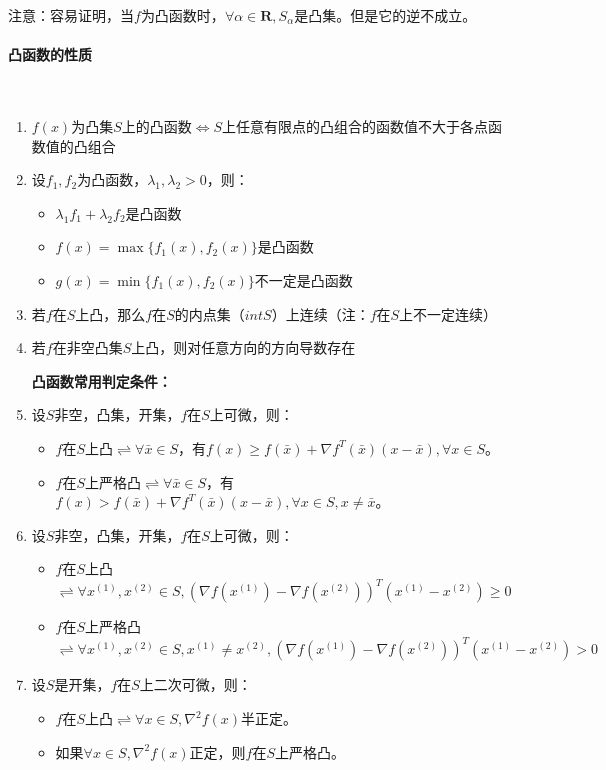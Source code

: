 \documentclass{book}
\newcommand{\subsubsubsection}[1]{\paragraph{#1}\mbox{}\\}
\begin{document}
注意：容易证明，当$f$为凸函数时，$\forall\alpha\in\mathbf{R}, S_{\alpha}$是凸集。但是它的逆不成立。

\subsubsubsection{凸函数的性质}

\begin{enumerate}
    \item $f(x)$为凸集$S$上的凸函数$\Leftrightarrow S$上任意有限点的凸组合的函数值不大于各点函数值的凸组合
    \item 设$f_1,f_2$为凸函数，$\lambda_1,\lambda_2>0$，则：
          \begin{itemize}
              \item $\lambda_1f_1+\lambda_2f_2$是凸函数
              \item $f(x)=\max\{f_1(x),f_2(x)\}$是凸函数
              \item $g(x)=\min\{f_1(x),f_2(x)\}$不一定是凸函数
          \end{itemize}
    \item 若$f$在$S$上凸，那么$f$在$S$的内点集（$intS$）上连续（注：$f$在$S$上不一定连续）
    \item 若$f$在非空凸集$S$上凸，则对任意方向的方向导数存在

          \textbf{凸函数常用判定条件：}
    \item 设$S$非空，凸集，开集，$f$在$S$上可微，则：
          \begin{itemize}
              \item $f$在$S$上凸$\rightleftharpoons \forall \bar{x}\in S$，有$f(x)\ge f(\bar{x})+\nabla f^T(\bar{x})(x-\bar{x}), \forall x\in S$。
              \item $f$在$S$上严格凸$\rightleftharpoons \forall \bar{x}\in S$，有$f(x)> f(\bar{x})+\nabla f^T(\bar{x})(x-\bar{x}), \forall x\in S,x\ne\bar{x}$。
          \end{itemize}
    \item 设$S$非空，凸集，开集，$f$在$S$上可微，则：
          \begin{itemize}
              \item $f$在$S$上凸$\rightleftharpoons \forall x^{(1)},x^{(2)}\in S,(\nabla f(x^{(1)})-\nabla f(x^{(2)}))^T(x^{(1)}-x^{(2)})\ge 0$
              \item $f$在$S$上严格凸$\rightleftharpoons \forall x^{(1)},x^{(2)}\in S, x^{(1)}\ne x^{(2)},(\nabla f(x^{(1)})-\nabla f(x^{(2)}))^T(x^{(1)}-x^{(2)})> 0$
          \end{itemize}
    \item 设$S$是开集，$f$在$S$上二次可微，则：
          \begin{itemize}
              \item $f$在$S$上凸$\rightleftharpoons \forall x\in S, \nabla^2f(x)$半正定。
              \item 如果$\forall x \in S, \nabla^2f(x)$正定，则$f$在$S$上严格凸。
          \end{itemize}
\end{enumerate}
\end{document}
